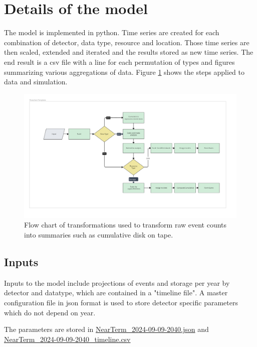 \documentclass[12pt]{article}
\begin{document}
   
     
  \section{Details of the model}
  
  The model is implemented in python.  Time series are created for each combination of detector, data type, resource and location.  Those time series are then  scaled, extended and iterated and the results stored as new time series.  The end result is a csv file with a line for each permutation of types and figures summarizing various aggregations of data. Figure \ref{fig:Flowchart} shows the steps applied to data and simulation. 
  
  \begin{figure}[ht]
\centering
\includegraphics[width=0.99 \textwidth]{Flowchart.pdf}
\caption{Flow chart of transformations used to transform raw event counts into summaries such as cumulative disk on tape. }
\label{fig:Flowchart}
\end{figure} 
  
  \subsection{Inputs}
  
 Inputs to the model include projections of events and storage per year by detector and datatype, which are contained in a "timeline file".  A master configuration file in json format is used to store detector specific parameters which do not depend on year. 
 
 The parameters are stored in \href{https://github.com/DUNE/CCB-data/blob/CCB-Jun24/model-2024/NearTerm_2024-09-09-2040.json}{NearTerm\_2024-09-09-2040.json} and  \href{https://github.com/DUNE/CCB-data/blob/CCB-Jun24/model-2024/NearTerm_2024-09-09-2040_timeline.csv}{NearTerm\_2024-09-09-2040\_timeline.csv}
 
\end{document}
